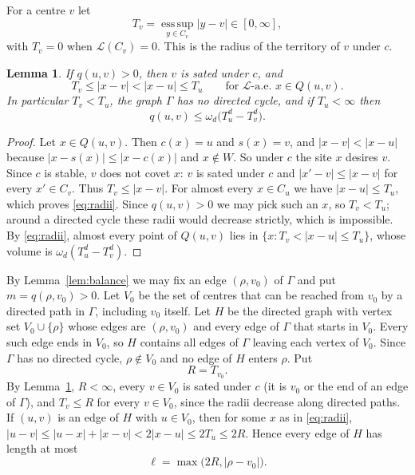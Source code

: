 \documentclass[11pt]{amsart}
\newtheorem{lemma}[theorem]{Lemma}
\theoremstyle{remark}
\numberwithin{equation}{section}
\newcommand{\Leb}{\mathcal{L}}
\begin{document}
For a centre $v$ let
\[
T_v=\operatorname*{ess\,sup}_{y\in C_v}|y-v|\in[0,\infty],
\]
with $T_v=0$ when $\Leb(C_v)=0$. This is the radius of the territory of $v$ under $c$.

\begin{lemma}\label{lem:radii}
If $q(u,v)>0$, then $v$ is sated under $c$, and
\begin{equation}\label{eq:radii}
T_v\le|x-v|<|x-u|\le T_u\qquad\text{for $\Leb$-a.e.\ } x\in Q(u,v).
\end{equation}
In particular $T_v<T_u$, the graph $\Gamma$ has no directed cycle, and if $T_u<\infty$ then
\begin{equation}\label{eq:shell}
q(u,v)\le\omega_d\bigl(T_u^d-T_v^d\bigr).
\end{equation}
\end{lemma}

\begin{proof}
Let $x\in Q(u,v)$. Then $c(x)=u$ and $s(x)=v$, and $|x-v|<|x-u|$ because $|x-s(x)|\le|x-c(x)|$ and $x\notin W$. So under $c$ the site $x$ desires $v$. Since $c$ is stable, $v$ does not covet $x$: $v$ is sated under $c$ and $|x'-v|\le|x-v|$ for every $x'\in C_v$. Thus $T_v\le|x-v|$. For almost every $x\in C_u$ we have $|x-u|\le T_u$, which proves \eqref{eq:radii}. Since $q(u,v)>0$ we may pick such an $x$, so $T_v<T_u$; around a directed cycle these radii would decrease strictly, which is impossible. By \eqref{eq:radii}, almost every point of $Q(u,v)$ lies in $\{x:T_v<|x-u|\le T_u\}$, whose volume is $\omega_d(T_u^d-T_v^d)$.
\end{proof}

By Lemma~\ref{lem:balance} we may fix an edge $(\rho,v_0)$ of $\Gamma$ and put $m=q(\rho,v_0)>0$. Let $V_0$ be the set of centres that can be reached from $v_0$ by a directed path in $\Gamma$, including $v_0$ itself. Let $H$ be the directed graph with vertex set $V_0\cup\{\rho\}$ whose edges are $(\rho,v_0)$ and every edge of $\Gamma$ that starts in $V_0$. Every such edge ends in $V_0$, so $H$ contains all edges of $\Gamma$ leaving each vertex of $V_0$. Since $\Gamma$ has no directed cycle, $\rho\notin V_0$ and no edge of $H$ enters $\rho$. Put
\[
R=T_{v_0}.
\]
By Lemma~\ref{lem:radii}, $R<\infty$, every $v\in V_0$ is sated under $c$ (it is $v_0$ or the end of an edge of $\Gamma$), and $T_v\le R$ for every $v\in V_0$, since the radii decrease along directed paths. If $(u,v)$ is an edge of $H$ with $u\in V_0$, then for some $x$ as in \eqref{eq:radii}, $|u-v|\le|u-x|+|x-v|<2|x-u|\le2T_u\le2R$. Hence every edge of $H$ has length at most
\[
\ell=\max\bigl(2R,|\rho-v_0|\bigr).
\]
\end{document}
